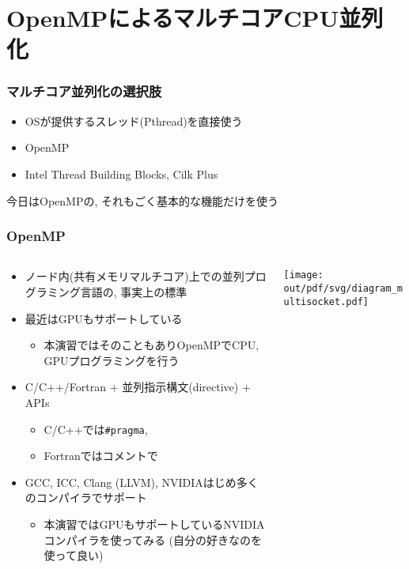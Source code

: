 \documentclass[10pt,dvipdfmx]{beamer}
\newcommand{\ao}[1]{{\color{blue}#1}}
\begin{document}
\section{OpenMPによるマルチコアCPU並列化}

\begin{frame}
\frametitle{マルチコア並列化の選択肢}
\begin{itemize}
\item OSが提供するスレッド(Pthread)を直接使う
\item \ao{OpenMP}
\item Intel Thread Building Blocks, Cilk Plus
\end{itemize}

今日はOpenMPの, それもごく基本的な機能だけを使う
\end{frame}


\begin{frame}
\frametitle{OpenMP}

\begin{columns}
  \begin{column}{0.6\textwidth}
\begin{itemize}
\item ノード内(共有メモリマルチコア)上での並列プログラミング言語の,
  事実上の標準
\item 最近はGPUもサポートしている
  \begin{itemize}
  \item 本演習ではそのこともありOpenMPでCPU, GPUプログラミングを行う
  \end{itemize}
\item C/C++/Fortran + \ao{並列指示構文(directive) + APIs}
  \begin{itemize}
  \item C/C++では\ao{\tt \#pragma}, 
  \item Fortranではコメントで
  \end{itemize}
\item GCC, ICC, Clang (LLVM), NVIDIAはじめ多くのコンパイラでサポート
  \begin{itemize}
  \item 本演習ではGPUもサポートしているNVIDIAコンパイラを使ってみる
    (自分の好きなのを使って良い)
  \end{itemize}
\end{itemize}
\end{column}
\begin{column}{0.4\textwidth}
  \begin{center}
    \texttt{[image: out/pdf/svg/diagram\_multisocket.pdf]}
  \end{center}
\end{column}
\end{columns}
\end{frame}
\end{document}
